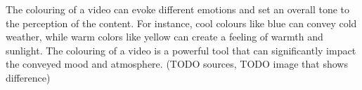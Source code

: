 \documentclass[12pt,a4paper]{article}
\begin{document}
The colouring of a video can evoke different emotions and set an overall tone to the perception of the content. For instance, cool colours like blue can convey cold weather, while warm colors like yellow can create a feeling of warmth and sunlight. 
The colouring of a video is a powerful tool that can significantly impact the conveyed mood and atmosphere. (TODO sources, TODO image that shows difference)








\end{document}
